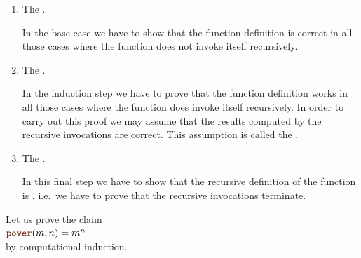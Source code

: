 \begin{enumerate}
\item The .

      In the base case we have to show that the function definition is correct in all those cases where the function
      does not invoke itself recursively.
\item The .

      In the induction step we have to prove that the function definition works in all those cases where
      the function does invoke itself recursively.  In order to carry out this proof we may
      assume that the results computed by the recursive invocations are correct.
      This assumption is called the .
\item The .

      In this final step we have to show that the recursive definition of the function is ,
      i.e.~we have to prove that the recursive invocations terminate.
\end{enumerate}
Let us prove the claim 
\\[0.2cm]
\hspace*{1.3cm}
 $\mytt{power}(m,n) = m^n$
\\[0.2cm] 
by computational induction.
